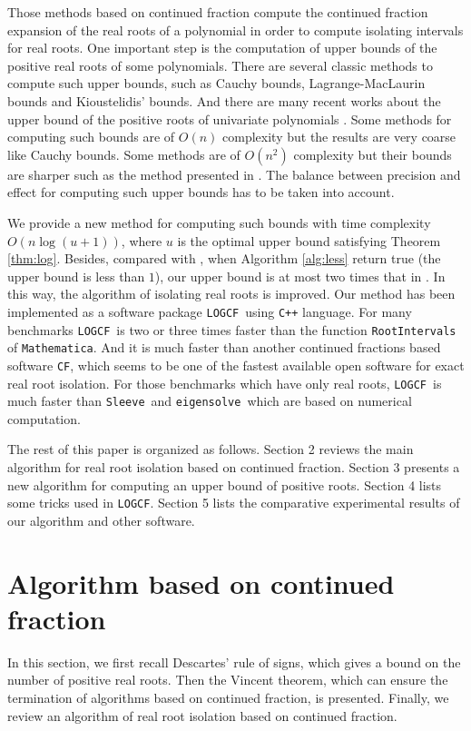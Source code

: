 \documentclass[10pt,a4paper]{article}
\def \froot {{\tt LOGCF}}
\def \MM {{\tt Mathematica}}
\def \cf {{\tt CF}}
\def \sle {{\tt Sleeve}}
\def \eign {{\tt eigensolve}}
\begin{document}
Those methods based on  continued fraction compute the continued fraction expansion of the real roots of a polynomial in order to compute isolating intervals for real roots. One important step
is the computation of upper bounds of the positive real roots of some polynomials. There are  several classic methods to compute such upper bounds, such as Cauchy bounds, Lagrange-MacLaurin  bounds and Kioustelidis' bounds. And there are many recent works about the upper bound of the positive roots of univariate polynomials \cite{hong98,ste05,akr05,akr06,akr08}. Some methods for computing such bounds are of $O(n)$ complexity but the results are very coarse like Cauchy bounds. Some methods are of $O(n^2)$ complexity but their bounds are sharper such as the method presented in \cite{akr08}. The balance between precision and effect for computing such upper bounds has to be taken into account.

We provide a new method for computing such bounds with time complexity $O(n\log(u+1))$, where $u$ is the optimal upper bound satisfying Theorem \ref{thm:log}. Besides, compared
with \cite{akr08}, when  Algorithm \ref{alg:less} return true (the upper bound is less than $1$), our upper bound is at most two times that in \cite{akr08}. In this way, the algorithm of   isolating real roots is improved.  Our  method has been implemented as a  software package \froot\ using \texttt{C++} language. For many benchmarks \froot \  is  two or three times
faster   than  the function {\tt RootIntervals} of \MM. And it  is much faster than   another continued fractions based software \cf, which seems to be one of the
fastest available open software for exact real root isolation. For those  benchmarks which  have only real roots, \froot\ is much faster than \sle\ and \eign\ which are based on numerical computation.


The rest of this paper is organized as follows. Section 2 reviews the
main algorithm for real root isolation based on  continued fraction. Section 3 presents a new algorithm for
computing an upper bound of positive roots. Section 4 lists some tricks used in \froot.  Section 5 lists the comparative experimental results of our algorithm and other software. %




\section{Algorithm based on  continued fraction}
In this section, we first recall Descartes' rule of signs, which gives a bound on the number of positive real roots. Then the Vincent theorem, which can ensure
the termination of algorithms based on  continued fraction, is presented. Finally, we review an algorithm of real root isolation based on  continued fraction.
\end{document}
